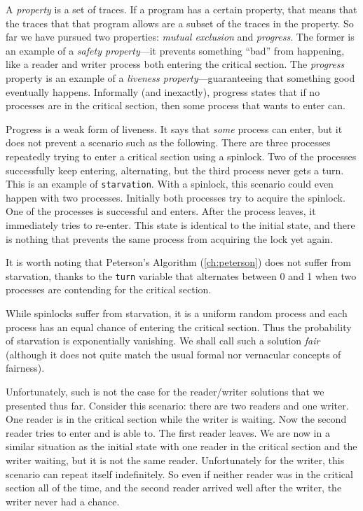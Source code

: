 \documentclass{report}
\begin{document}
%

A \emph{property}
%
is a set of traces.
If a program has a certain property, that means that the traces that that
program allows are a subset of the traces in the property.
So far we have pursued two properties: \emph{mutual exclusion}
and \emph{progress}.  The former is an example of a
\emph{safety property}---it prevents something ``bad'' from
happening, like a reader and writer process both entering the
critical section.  The \emph{progress} property is an example
of a \emph{liveness property}---guaranteeing that something good
eventually happens.
Informally (and inexactly), progress states that if no processes
are in the critical section, then some process that wants to enter
can.

Progress is a weak form of liveness.  It says that \emph{some}
process can enter, but it does not prevent a scenario such as
the following.  There are three processes repeatedly trying to
enter a critical section using a spinlock.  Two of
the processes successfully keep entering, alternating, but the third
process never gets a turn.  This is an example of
\texttt{starvation}.  With a spinlock, this scenario could
even happen with two processes.  Initially both processes
try to acquire the spinlock.  One of the processes is
successful and enters.  After the process leaves, it immediately
tries to re-enter.  This state is identical to the initial
state, and there is nothing that prevents the same process
from acquiring the lock yet again.

It is worth noting that Peterson's Algorithm (\autoref{ch:peterson})
does not suffer from starvation, thanks to the \texttt{turn} variable
that alternates between 0 and 1 when two processes are contending for
the critical section.

While spinlocks suffer from starvation, it is a uniform random
process and each process has an equal chance of entering the critical
section.  Thus the probability of starvation is exponentially vanishing.
We shall call such a solution \emph{fair}
%
(although it does not quite
match the usual formal nor vernacular concepts of fairness).

%

Unfortunately, such is not the case for the
reader/writer solutions that we presented thus far.
Consider this scenario: there are two readers and one writer.  One reader
is in the critical section while the writer is waiting.  Now the
second reader tries to enter and is able to.  The first reader leaves.
We are now in a similar situation as the initial state with one reader
in the critical section and the writer waiting, but it is not the same
reader.  Unfortunately for the writer, this scenario can repeat itself
indefinitely.  So even if neither reader was in the critical section
all of the time, and the second reader arrived well after the writer,
the writer never had a chance.
\end{document}
